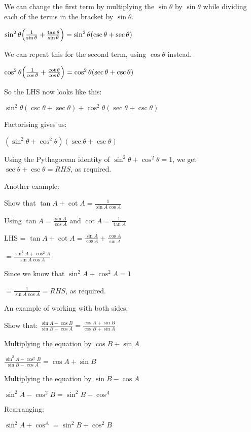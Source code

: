 \documentclass[../main.tex]{subfiles}
\begin{document}
We can change the first term by multiplying the $\sin{\theta}$ by $\sin{\theta}$ while dividing each of the terms in the bracket by $\sin{\theta}$.

$\sin^2{\theta}\Bigl(\frac{1}{\sin{\theta}}+\frac{\tan{\theta}}{\sin{\theta}}\Bigr)=\sin^2{\theta}(\csc{\theta}+\sec{\theta})$

We can repeat this for the second term, using $\cos{\theta}$ instead.

$\cos^2{\theta}\Bigl(\frac{1}{\cos{\theta}}+\frac{\cot{\theta}}{\cos{\theta}}\Bigr)=\cos^2{\theta}(\sec{\theta}+\csc{\theta})$

So the LHS now looks like this:

\(\sin^2{\theta}(\csc{\theta}+\sec{\theta})+\cos^2{\theta}(\sec{\theta}+\csc{\theta})\)

Factorising gives us:

$(\sin^2{\theta}+\cos^2{\theta})(\sec{\theta}+\csc{\theta})$

Using the Pythagorean identity of $\sin^2{\theta}+\cos^2{\theta}=1$, we get $\sec{\theta}+\csc{\theta}=RHS$, as required.

\vspace{5mm}
Another example:

Show that $\tan{A}+\cot{A}=\frac{1}{\sin{A}\cos{A}}$

Using $\tan{A}=\frac{\sin{A}}{\cos{A}}$ and $\cot{A}=\frac{1}{\tan{A}}$

LHS = $\tan{A}+\cot{A}=\frac{\sin{A}}{\cos{A}}+\frac{\cos{A}}{\sin{A}}$

$=\frac{\sin^2{A}+\cos^2{A}}{\sin{A}\cos{A}}$

Since we know that $\sin^2{A}+\cos^2{A}=1$

$=\frac{1}{\sin{A}\cos{A}}=RHS$, as required.

\vspace{5mm}
An example of working with both sides:

Show that: $\frac{\sin{A}-\cos{B}}{\sin{B}-\cos{A}}=\frac{\cos{A}+\sin{B}}{\cos{B}+\sin{A}}$

Multiplying the equation by $\cos{B}+\sin{A}$

$\frac{\sin^2{A}-\cos^2{B}}{\sin{B}-\cos{A}}=\cos{A}+\sin{B}$

Multiplying the equation by $\sin{B}-\cos{A}$

$\sin^2{A}-\cos^2{B}=\sin^2{B}-\cos^{A}$

Rearranging:

$\sin^2{A}+\cos^{A}=\sin^2{B}+\cos^2{B}$
\end{document}
